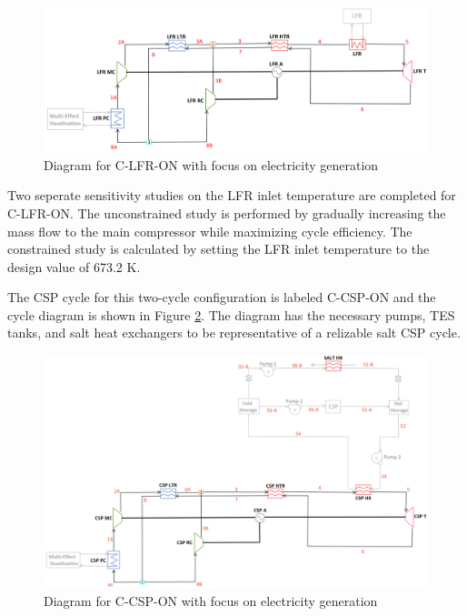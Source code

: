 \begin{figure}[H] 
    \widefigure
    \includegraphics[width=\linewidth]{Definitions/c-lfr-on.pdf}
    \caption{Diagram for C-LFR-ON with focus on electricity generation\label{c-lfr-on}}
\end{figure}
\begin{paracol}{2}
\linenumbers
\switchcolumn

Two seperate sensitivity studies on the LFR inlet temperature are completed for C-LFR-ON. The unconstrained study is performed by gradually increasing the mass flow to the main compressor while maximizing cycle efficiency. The constrained study is calculated by setting the LFR inlet temperature to the design value of 673.2 K. 

The CSP cycle for this two-cycle configuration is labeled C-CSP-ON and the cycle diagram is shown in Figure \ref{c-csp-on}. The diagram has the necessary pumps, TES tanks, and salt heat exchangers to be representative of a relizable salt CSP cycle.

\end{paracol}
\begin{figure}[H] 
    \widefigure
    \includegraphics[width=\linewidth]{Definitions/c-csp-on.pdf}
    \caption{Diagram for C-CSP-ON with focus on electricity generation\label{c-csp-on}}
\end{figure}
